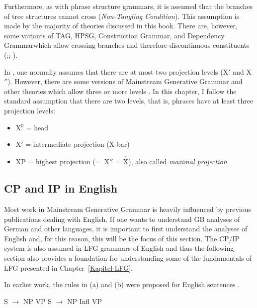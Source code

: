 Furthermore, as with phrase structure grammars, it is assumed that the branches of tree structures
cannot cross (\emph{Non-Tangling Condition}). This assumption is made by
the majority of theories discussed in this book. There are, however, some variants of TAG\indextag,
HPSG\indexhpsg, Construction Grammar\indexcxg, and Dependency Grammar\indexdg which allow crossing branches and therefore
discontinuous constituents
(\citealp*{BJR91a,Reape94a,BC2005a};\citealp[]{Heringer96a-u}; \citealp[Section~9.6.2]{Eroms2000a}).

In \xbart, one normally assumes that there are at most two projection levels (X$'$ and X$''$). However, there are some versions of Mainstream
Generative Grammar and other theories which allow three or more levels \citep{Jackendoff77,Uszkoreit87a}. In this chapter, I follow the
standard assumption that there are two levels, that is, phrases have at least three projection levels:


\begin{itemize}
\item X$^0$ = head
\item X$'$ = intermediate projection (X bar) 
\item XP = highest projection (=~X$''$ = $\overline{\overline{\mbox{X}}}$), also called \emph{maximal projection} 
\end{itemize}

\subsection{CP and IP in English}
\label{Abschnitt-GB-CP-IP-System-Englisch}\label{sec-GB-CP-IP-System-English}

Most work in Mainstream Generative Grammar is heavily influenced by previous publications dealing with English. If one wants to understand GB analyses of
German and other languages, it is important to first understand the analyses of English and, for this reason, this will be the focus of this section.
The CP/IP system is also assumed in LFG grammars of English and thus the following section also provides a foundation for understanding some of the
fundamentals of LFG presented in Chapter~\ref{Kapitel-LFG}.

In earlier work, the rules in (a) and (b) were proposed for English sentences \citep[]{Chomsky81a}.

\eal
\ex S $\to$ NP VP
\ex S $\to$ NP Infl VP
\zl

